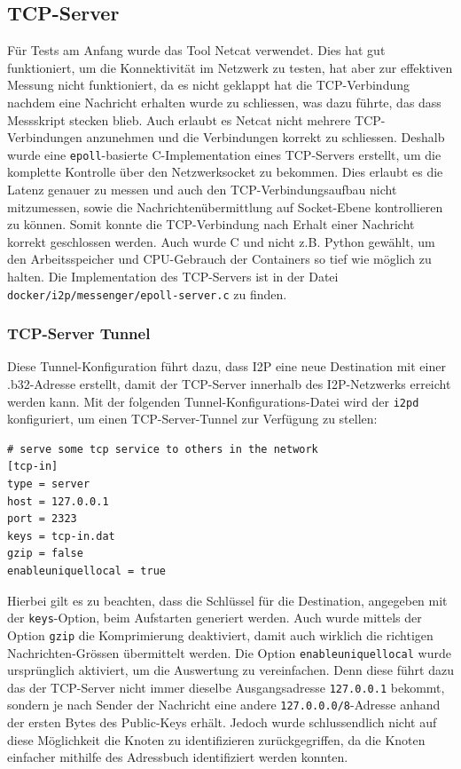 \subsection{TCP-Server}\label{sec:tcpserver}

Für Tests am Anfang wurde das Tool Netcat verwendet.
Dies hat gut funktioniert, um die Konnektivität im Netzwerk zu testen,
hat aber zur effektiven Messung nicht funktioniert, da es nicht geklappt hat die TCP-Verbindung nachdem eine Nachricht erhalten wurde zu schliessen, was dazu führte, das dass Messskript stecken blieb.
Auch erlaubt es Netcat nicht mehrere TCP-Verbindungen anzunehmen und die Verbindungen korrekt zu schliessen.
Deshalb wurde eine \lstinline|epoll|-basierte C-Implementation eines TCP-Servers erstellt, um die komplette Kontrolle über den Netzwerksocket zu bekommen.
Dies erlaubt es die Latenz genauer zu messen und auch den TCP-Verbindungsaufbau nicht mitzumessen, sowie die Nachrichtenübermittlung auf Socket-Ebene kontrollieren zu können.
Somit konnte die TCP-Verbindung nach Erhalt einer Nachricht korrekt geschlossen werden.
Auch wurde C und nicht z.B. Python gewählt, um den Arbeitsspeicher und CPU-Gebrauch der Containers so tief wie möglich zu halten.
Die Implementation des TCP-Servers ist in der Datei \lstinline|docker/i2p/messenger/epoll-server.c| zu finden.

\subsubsection{TCP-Server Tunnel}

Diese Tunnel-Konfiguration führt dazu, dass I2P eine neue Destination mit einer .b32-Adresse erstellt, damit der TCP-Server innerhalb des I2P-Netzwerks erreicht werden kann.
Mit der folgenden Tunnel-Konfigurations-Datei wird der \lstinline|i2pd| konfiguriert, um einen TCP-Server-Tunnel zur Verfügung zu stellen:
\begin{lstlisting}
# serve some tcp service to others in the network
[tcp-in]
type = server
host = 127.0.0.1
port = 2323
keys = tcp-in.dat
gzip = false
enableuniquellocal = true
\end{lstlisting}

Hierbei gilt es zu beachten, dass die Schlüssel für die Destination, angegeben mit der \lstinline|keys|-Option, beim Aufstarten generiert werden.
Auch wurde mittels der Option \lstinline|gzip| die Komprimierung deaktiviert, damit auch wirklich die richtigen Nachrichten-Grössen übermittelt werden.
Die Option \lstinline|enableuniquellocal| wurde ursprünglich aktiviert, um die Auswertung zu vereinfachen. Denn diese führt dazu das der TCP-Server nicht immer dieselbe Ausgangsadresse \lstinline|127.0.0.1| bekommt, sondern je nach Sender der Nachricht eine andere \lstinline|127.0.0.0/8|-Adresse anhand der ersten Bytes des Public-Keys erhält. Jedoch wurde schlussendlich nicht auf diese Möglichkeit die Knoten zu identifizieren zurückgegriffen, da die Knoten einfacher mithilfe des Adressbuch identifiziert werden konnten.

